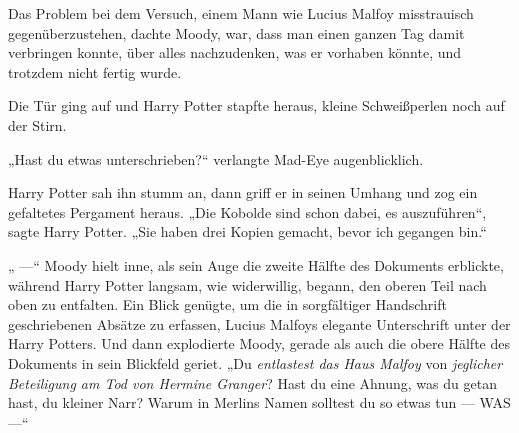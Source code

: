 Das Problem bei dem Versuch, einem Mann wie Lucius Malfoy misstrauisch gegenüberzustehen, dachte Moody, war, dass man einen ganzen Tag damit verbringen konnte, über alles nachzudenken, was er vorhaben könnte, und trotzdem nicht fertig wurde.

Die Tür ging auf und Harry Potter stapfte heraus, kleine Schweißperlen noch auf der Stirn.

„Hast du etwas unterschrieben?“ verlangte Mad-Eye augenblicklich.

Harry Potter sah ihn stumm an, dann griff er in seinen Umhang und zog ein gefaltetes Pergament heraus.
„Die Kobolde sind schon dabei, es auszuführen“, sagte Harry Potter.
„Sie haben drei Kopien gemacht, bevor ich gegangen bin.“

„ —“
Moody hielt inne, als sein Auge die zweite Hälfte des Dokuments erblickte, während Harry Potter langsam, wie widerwillig, begann, den oberen Teil nach oben zu entfalten. Ein Blick genügte, um die in sorgfältiger Handschrift geschriebenen Absätze zu erfassen, Lucius Malfoys elegante Unterschrift unter der Harry Potters. Und dann explodierte Moody, gerade als auch die obere Hälfte des Dokuments in sein Blickfeld geriet.
„Du \emph{entlastest das Haus Malfoy} von \emph{jeglicher Beteiligung am Tod von Hermine Granger}? Hast du eine Ahnung, was du getan hast, du kleiner Narr? Warum in Merlins Namen solltest du so etwas tun — WAS —“

